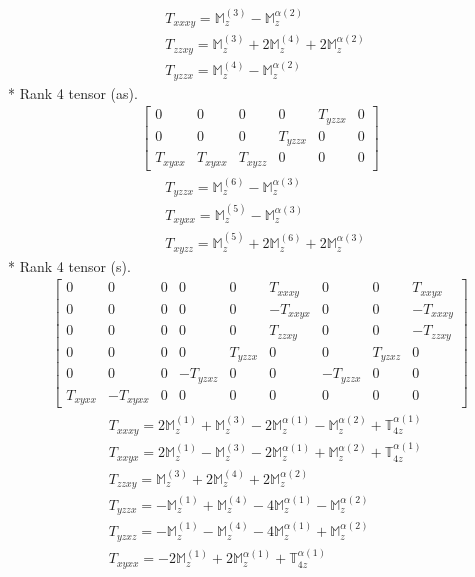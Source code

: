 \documentclass[fleqn,8pt,landscape]{jsarticle}
\begin{document}
\begin{align*}
& T_{xxxy} = \mathbb{M}_{z}^{(3)} - \mathbb{M}_{z}^{\alpha(2)} \\
& T_{zzxy} = \mathbb{M}_{z}^{(3)} + 2 \mathbb{M}_{z}^{(4)} + 2 \mathbb{M}_{z}^{\alpha(2)} \\
& T_{yzzx} = \mathbb{M}_{z}^{(4)} - \mathbb{M}_{z}^{\alpha(2)}
\end{align*}
* Rank 4 tensor (as).
\begin{align*}
\begin{bmatrix} 0 & 0 & 0 & 0 & T_{yzzx} & 0 \\ 0 & 0 & 0 & T_{yzzx} & 0 & 0 \\ T_{xyxx} & T_{xyxx} & T_{xyzz} & 0 & 0 & 0 \end{bmatrix}
\end{align*}
\begin{align*}
& T_{yzzx} = \mathbb{M}_{z}^{(6)} - \mathbb{M}_{z}^{\alpha(3)} \\
& T_{xyxx} = \mathbb{M}_{z}^{(5)} - \mathbb{M}_{z}^{\alpha(3)} \\
& T_{xyzz} = \mathbb{M}_{z}^{(5)} + 2 \mathbb{M}_{z}^{(6)} + 2 \mathbb{M}_{z}^{\alpha(3)}
\end{align*}
* Rank 4 tensor (s).
\begin{align*}
\begin{bmatrix} 0 & 0 & 0 & 0 & 0 & T_{xxxy} & 0 & 0 & T_{xxyx} \\ 0 & 0 & 0 & 0 & 0 & - T_{xxyx} & 0 & 0 & - T_{xxxy} \\ 0 & 0 & 0 & 0 & 0 & T_{zzxy} & 0 & 0 & - T_{zzxy} \\ 0 & 0 & 0 & 0 & T_{yzzx} & 0 & 0 & T_{yzxz} & 0 \\ 0 & 0 & 0 & - T_{yzxz} & 0 & 0 & - T_{yzzx} & 0 & 0 \\ T_{xyxx} & - T_{xyxx} & 0 & 0 & 0 & 0 & 0 & 0 & 0 \end{bmatrix}
\end{align*}
\begin{align*}
& T_{xxxy} = 2 \mathbb{M}_{z}^{(1)} + \mathbb{M}_{z}^{(3)} - 2 \mathbb{M}_{z}^{\alpha(1)} - \mathbb{M}_{z}^{\alpha(2)} + \mathbb{T}_{4z}^{\alpha(1)} \\
& T_{xxyx} = 2 \mathbb{M}_{z}^{(1)} - \mathbb{M}_{z}^{(3)} - 2 \mathbb{M}_{z}^{\alpha(1)} + \mathbb{M}_{z}^{\alpha(2)} + \mathbb{T}_{4z}^{\alpha(1)} \\
& T_{zzxy} = \mathbb{M}_{z}^{(3)} + 2 \mathbb{M}_{z}^{(4)} + 2 \mathbb{M}_{z}^{\alpha(2)} \\
& T_{yzzx} = - \mathbb{M}_{z}^{(1)} + \mathbb{M}_{z}^{(4)} - 4 \mathbb{M}_{z}^{\alpha(1)} - \mathbb{M}_{z}^{\alpha(2)} \\
& T_{yzxz} = - \mathbb{M}_{z}^{(1)} - \mathbb{M}_{z}^{(4)} - 4 \mathbb{M}_{z}^{\alpha(1)} + \mathbb{M}_{z}^{\alpha(2)} \\
& T_{xyxx} = - 2 \mathbb{M}_{z}^{(1)} + 2 \mathbb{M}_{z}^{\alpha(1)} + \mathbb{T}_{4z}^{\alpha(1)}
\end{align*}
\end{document}
